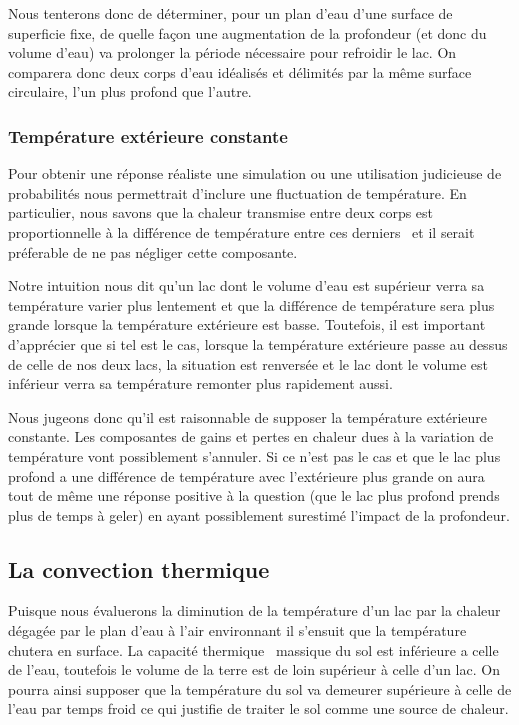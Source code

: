 \documentclass[12pt]{article}
\numberwithin{figure}{section}
\begin{document}
Nous tenterons donc de d\'eterminer, pour un plan d'eau d'une surface de superficie fixe, de quelle fa\c
con une augmentation de la profondeur (et donc du volume d'eau) va prolonger la p\'eriode n\'ecessaire
pour refroidir le lac. On comparera donc deux corps d'eau id\'ealis\'es et d\'elimit\'es par la m\^eme
surface circulaire, l'un plus profond que l'autre.

\subsubsection{Temp\'erature ext\'erieure constante}\label{TempExt}

Pour obtenir une r\'eponse r\'ealiste une simulation ou une utilisation judicieuse de probabilit\'es
nous permettrait d'inclure une fluctuation de temp\'erature. En particulier, nous savons que la
chaleur transmise entre deux corps est proportionnelle \`a la diff\'erence de temp\'erature entre
ces derniers~\cite{Fourier} et il serait pr\'eferable de ne pas n\'egliger cette composante.

Notre intuition nous dit qu'un lac dont le volume d'eau est sup\'erieur verra sa temp\'erature
varier plus lentement et que la diff\'erence de temp\'erature sera plus grande lorsque la
temp\'erature ext\'erieure est basse. Toutefois, il est important d'appr\'ecier que si tel est le
cas, lorsque la temp\'erature ext\'erieure passe au dessus de celle de nos deux lacs, la situation
est renvers\'ee et le lac dont le volume est inf\'erieur verra sa temp\'erature remonter plus
rapidement aussi.

Nous jugeons donc qu'il est raisonnable de supposer la temp\'erature ext\'erieure constante. Les
composantes de gains et pertes en chaleur dues \`a la variation de temp\'erature vont possiblement
s'annuler. Si ce n'est pas le cas et que le lac plus profond a une diff\'erence de temp\'erature
avec l'ext\'erieure plus grande on aura tout de m\^eme une r\'eponse positive \`a la question (que
le lac plus profond prends plus de temps \`a geler) en ayant possiblement surestim\'e l'impact de
la profondeur.

\subsection{La convection thermique}\label{Convec}

Puisque nous \'evaluerons la diminution de la temp\'erature d'un lac par la chaleur d\'egag\'ee par
le plan d'eau \`a l'air environnant il s'ensuit que la temp\'erature chutera en surface. La
capacit\'e thermique~\cite{CapTherm} massique du sol est inf\'erieure a celle de l'eau, toutefois le
volume de la terre est de loin sup\'erieur \`a celle d'un lac. On pourra ainsi supposer que la
temp\'erature du sol va demeurer sup\'erieure \`a celle de l'eau par temps froid ce qui justifie de
traiter le sol comme une source de chaleur.
\end{document}
